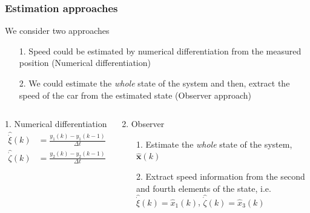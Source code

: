 \begin{frame}
    \frametitle{Estimation approaches}
    We consider two approaches
    \begin{itemize}
        \item [1.] Speed could be estimated by numerical differentiation from the measured position (Numerical differentiation)
        \item [2.] We could estimate the \emph{whole} state of the system and then, extract the speed of the car from the estimated state (Observer approach)
    \end{itemize}

     \begin{columns}[t]
        \begin{block}{1. Numerical differentiation}
            \vspace*{-1em}
            \begin{align*}
            \hat{\dot{\xi}}(k)& = \frac{y_1(k) - y_1(k-1)}{\Delta t}\\
            \hat{\dot{\zeta}}(k)& = \frac{y_2(k) - y_2(k-1)}{\Delta t}
            \end{align*}
        \end{block}
        \begin{block}{2. Observer}
        	\begin{enumerate}
        		\item [1.] Estimate the \emph{whole} state of the system, $\hat{\bm{x}}(k)$
        	
            	\item [2.] Extract speed information from the second and fourth elements of the state, i.e. 
            	$\hat{\dot{\xi}}(k)= \hat{x}_1(k)$, 
            	 $\hat{\dot{\zeta}}(k)=\hat{x}_3(k)$
        	\end{enumerate}
        \end{block}	
    \end{columns} 
\end{frame}

